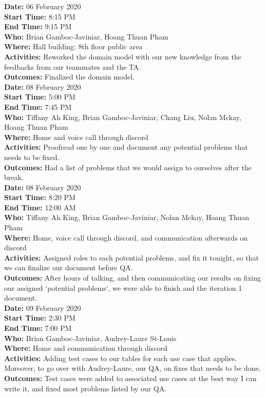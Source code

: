 \documentclass[12pt]{article}
\begin{document}
{\bf Date:} 06 February 2020\\
{\bf Start Time:} 8:15 PM\\
{\bf End Time:} 9:15 PM \\
{\bf Who:} Brian Gamboc-Javiniar, Hoang Thuan Pham\\
{\bf Where:} Hall building: 8th floor public area \\
{\bf Activities:} Reworked the domain model with our new knowledge from the feedbacks from our teammates and the TA.\\
{\bf Outcomes:} Finalized the domain model.\\

{\bf Date:} 08 February 2020\\
{\bf Start Time:} 5:00 PM\\
{\bf End Time:} 7:45 PM \\
{\bf Who:} Tiffany Ah King, Brian Gamboc-Javiniar, Chang Liu, Nolan Mckay, Hoang Thuan Pham\\
{\bf Where:} Home and voice call through discord \\
{\bf Activities:} Proofread one by one and document any potential problems that needs to be fixed.\\
{\bf Outcomes:} Had a list of problems that we would assign to ourselves after the break.\\

{\bf Date:} 08 February 2020\\
{\bf Start Time:} 8:20 PM\\
{\bf End Time:} 12:00 AM \\
{\bf Who:} Tiffany Ah King, Brian Gamboc-Javiniar, Nolan Mckay, Hoang Thuan Pham\\
{\bf Where:} Home, voice call through discord, and communication afterwards on discord \\
{\bf Activities:} Assigned roles to each potential problems, and fix it tonight, so that we can finalize our document before QA.\\
{\bf Outcomes:} After hours of talking, and then communicating our results on fixing our assigned `potential problems`, we were able to finish and the iteration 1 document.\\

{\bf Date:} 09 February 2020\\
{\bf Start Time:} 2:30 PM\\
{\bf End Time:} 7:00 PM \\
{\bf Who:} Brian Gamboc-Javiniar, Audrey-Laure St-Louis\\
{\bf Where:} Home and communication through discord \\
{\bf Activities:} Adding test cases to our tables for each use case that applies. Moreover, to go over with Audrey-Laure, our QA, on fixes that needs to be done. \\
{\bf Outcomes:} Test cases were added to associated use cases at the best way I can write it, and fixed most problems listed by our QA.\\
\end{document}

